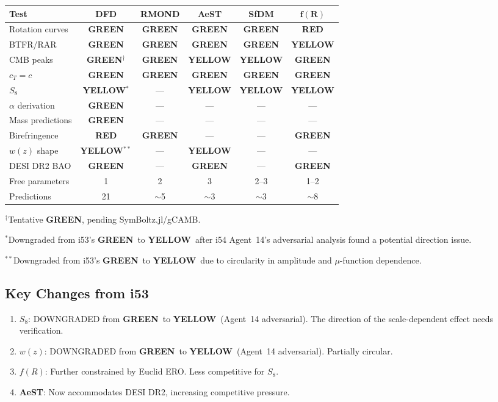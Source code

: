 \documentclass[11pt,a4paper]{article}
\newcommand{\GREEN}{\textcolor{dfdgreen}{\textbf{GREEN}}}
\newcommand{\YELLOW}{\textcolor{dfdyellow}{\textbf{YELLOW}}}
\newcommand{\RED}{\textcolor{dfdred}{\textbf{RED}}}
\begin{document}
\begin{center}
\begin{longtable}{p{3.5cm}ccccc}
\toprule
\textbf{Test} & \textbf{DFD} & \textbf{RMOND} & \textbf{AeST} & \textbf{SfDM} & $\mathbf{f(R)}$ \\
\midrule
Rotation curves & \GREEN & \GREEN & \GREEN & \GREEN & \RED \\
BTFR/RAR & \GREEN & \GREEN & \GREEN & \GREEN & \YELLOW \\
CMB peaks & \GREEN$^\dagger$ & \GREEN & \YELLOW & \YELLOW & \GREEN \\
$c_T = c$ & \GREEN & \GREEN & \GREEN & \GREEN & \GREEN \\
$S_8$ & \YELLOW$^*$ & --- & \YELLOW & \YELLOW & \YELLOW \\
$\alpha$ derivation & \GREEN & --- & --- & --- & --- \\
Mass predictions & \GREEN & --- & --- & --- & --- \\
Birefringence & \RED & \GREEN & --- & --- & \GREEN \\
$w(z)$ shape & \YELLOW$^{**}$ & --- & \YELLOW & --- & --- \\
DESI DR2 BAO & \GREEN & --- & \GREEN & --- & \GREEN \\
Free parameters & 1 & 2 & 3 & 2--3 & 1--2 \\
Predictions & 21 & $\sim$5 & $\sim$3 & $\sim$3 & $\sim$8 \\
\bottomrule
\end{longtable}
\end{center}

$^\dagger$Tentative \GREEN, pending SymBoltz.jl/gCAMB.

$^*$Downgraded from i53's \GREEN\ to \YELLOW\ after i54 Agent~14's adversarial analysis found a potential direction issue.

$^{**}$Downgraded from i53's \GREEN\ to \YELLOW\ due to circularity in amplitude and $\mu$-function dependence.

\subsection{Key Changes from i53}

\begin{enumerate}
\item \textbf{$S_8$}: DOWNGRADED from \GREEN\ to \YELLOW\ (Agent~14 adversarial). The direction of the scale-dependent effect needs verification.
\item \textbf{$w(z)$}: DOWNGRADED from \GREEN\ to \YELLOW\ (Agent~14 adversarial). Partially circular.
\item \textbf{$f(R)$}: Further constrained by Euclid ERO. Less competitive for $S_8$.
\item \textbf{AeST}: Now accommodates DESI DR2, increasing competitive pressure.
\end{enumerate}
\end{document}

